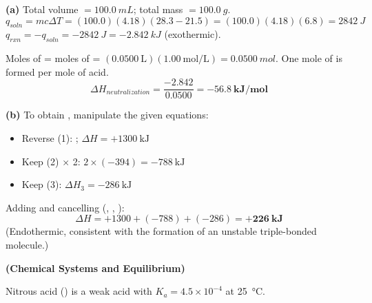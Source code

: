 \documentclass[addpoints]{exam}
\begin{document}
\begin{questions}
\begin{solution}[10cm]
\textbf{(a)} Total volume $= \SI{100.0}{mL}$; total mass $= \SI{100.0}{g}$.
\[
q_{soln} = mc\Delta T = (100.0)(4.18)(28.3 - 21.5) = (100.0)(4.18)(6.8) = \SI{2842}{J}
\]
$q_{rxn} = -q_{soln} = \SI{-2842}{J} = \SI{-2.842}{kJ}$ (exothermic).

Moles of  = moles of  = $(0.0500\ \text{L})(1.00\ \text{mol/L}) =
\SI{0.0500}{mol}$. One mole of  is formed per mole of acid.
\[
\Delta H_{neutralization} = \frac{-2.842}{0.0500} = \mathbf{-56.8\ kJ/mol}
\]

\textbf{(b)} To obtain , manipulate the given equations:
\begin{itemize}
    \item Reverse (1): ; $\Delta H = +1300\ \text{kJ}$
    \item Keep (2) $\times$ 2: $2 \times (-394) = -788\ \text{kJ}$
    \item Keep (3): $\Delta H_3 = -286\ \text{kJ}$
\end{itemize}
Adding and cancelling (, , ):
\[
\Delta H = +1300 + (-788) + (-286) = \mathbf{+226\ kJ}
\]
(Endothermic, consistent with the formation of an unstable triple-bonded molecule.)
\end{solution}

\question \textbf{(Chemical Systems and Equilibrium)}

Nitrous acid () is a weak acid with $K_a = 4.5\times10^{-4}$ at \SI{25}{\celsius}.
\end{questions}
\end{document}
